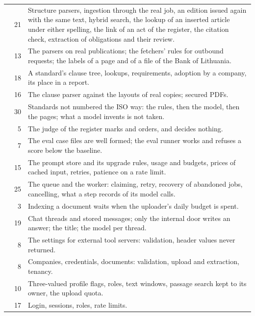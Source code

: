 \begin{xltabular}{\textwidth}{@{}L{38mm}rY@{}}
 & 21 & Structure parsers, ingestion through the real job, an edition issued again with the same text, hybrid search, the lookup of an inserted article under either spelling, the link of an act of the register, the citation check, extraction of obligations and their review. \\
 & 13 & The parsers on real publications; the fetchers' rules for outbound requests; the labels of a page and of a file of the Bank of Lithuania. \\
 & 18 & A standard's clause tree, lookups, requirements, adoption by a company, its place in a report. \\
 & 16 & The clause parser against the layouts of real copies; secured PDFs. \\
 & 30 & Standards not numbered the ISO way: the rules, then the model, then the pages; what a model invents is not taken. \\
 & 5 & The judge of the register marks and orders, and decides nothing. \\
 & 7 & The eval case files are well formed; the eval runner works and refuses a score below the baseline. \\
 & 15 & The prompt store and its upgrade rules, usage and budgets, prices of cached input, retries, patience on a rate limit. \\
 & 25 & The queue and the worker: claiming, retry, recovery of abandoned jobs, cancelling, what a step records of its model calls. \\
 & 3 & Indexing a document waits when the uploader's daily budget is spent. \\
 & 19 & Chat threads and stored messages; only the internal door writes an answer; the title; the model per thread. \\
 & 8 & The settings for external tool servers: validation, header values never returned. \\
 & 8 & Companies, credentials, documents: validation, upload and extraction, tenancy. \\
 & 10 & Three-valued profile flags, roles, text windows, passage search kept to its owner, the upload quota. \\
 & 17 & Login, sessions, roles, rate limits. \\

\end{xltabular}
